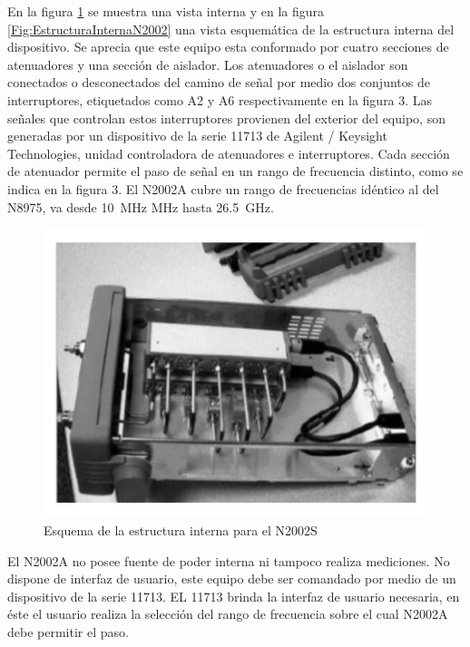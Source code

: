 En la figura \ref{Fig:VistaInternaN2002} se muestra una vista interna y en la figura \ref{Fig:EstructuraInternaN2002} una vista esquemática de la estructura interna del dispositivo. Se aprecia que este equipo esta conformado por cuatro secciones de atenuadores y una sección de aislador. Los atenuadores o el aislador son conectados o desconectados del camino de señal por medio dos conjuntos de interruptores, etiquetados como A2 y A6 respectivamente en la figura 3. Las señales que controlan estos interruptores provienen del exterior del equipo, son generadas por un dispositivo de la serie 11713 de Agilent / Keysight Technologies, unidad controladora de atenuadores e interruptores. Cada sección de atenuador permite el paso de señal en un rango de frecuencia distinto,
como se indica en la figura 3. El N2002A cubre un rango de frecuencias idéntico al del N8975, va desde \SI{10}{\mega\hertz} MHz hasta \SI{26.5}{\giga\hertz}. 

\begin{figure}[h!]			
	\centering
	\includegraphics[width=15cm]{Imagenes/VistaInternaN2002.pdf}
	\caption{Esquema de la estructura interna para el N2002S}
	\label{Fig:VistaInternaN2002}
\end{figure}

El N2002A no posee fuente de poder interna ni tampoco realiza mediciones. No dispone de interfaz de usuario, este equipo debe ser comandado por medio de un dispositivo de la serie 11713. EL 11713 brinda la interfaz de usuario necesaria, en	éste el usuario realiza la selección del rango de frecuencia sobre el cual N2002A debe permitir el paso.		

